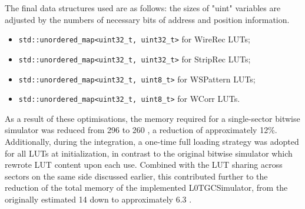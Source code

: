 The final data structures used are as follows: the sizes of "uint" variables are adjusted by the numbers of necessary bits of address and position information.
\begin{itemize}
  \item \texttt{std::unordered\_map<uint32\_t, uint32\_t>} for WireRec LUTs;
  \item \texttt{std::unordered\_map<uint32\_t, uint32\_t>} for StripRec LUTs;
  \item \texttt{std::unordered\_map<uint32\_t, uint8\_t>}  for WSPattern LUTs;
  \item \texttt{std::unordered\_map<uint32\_t, uint8\_t>}  for WCorr LUTs.
\end{itemize}

As a result of these optimisations, the memory required for a single-sector bitwise simulator was reduced from 296  to 260 , a reduction of approximately 12\%. Additionally, during the integration, a one-time full loading strategy was adopted for all LUTs at initialization, in contrast to the original bitwise simulator which rewrote LUT content upon each use. Combined with the LUT sharing across sectors on the same side discussed earlier, this contributed further to the reduction of the total memory of the implemented L0TGCSimulator, from the originally estimated 14  down to approximately 6.3 .
